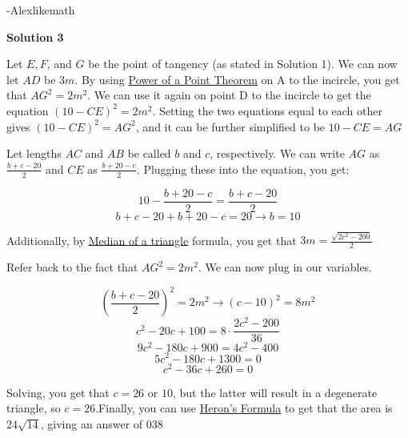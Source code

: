 \begin{enumerate}
 -Alexlikemath

 



\textbf{Solution 3}

Let $E, F$, and $G$ be the point of tangency (as stated in Solution 1). We can now let $AD$ be $3m$. By using \href{https://artofproblemsolving.com/wiki/index.php?title=Power\_of\_a\_Point\_Theorem}{Power of a Point Theorem} on A to the incircle, you get that $AG^2 = 2m^2$. We can use it again on point D to the incircle to get the equation $(10 - CE)^2 = 2m^2$. Setting the two equations equal to each other gives $(10 - CE)^2 = AG^2$, and it can be further simplified to be $10 - CE = AG$

 Let lengths $AC$ and $AB$ be called $b$ and $c$, respectively. We can write $AG$ as $\frac{b + c - 20}{2}$ and $CE$ as $\frac{b + 20 - c}{2}$. Plugging these into the equation, you get:

 
 \[10 - \frac{b + 20 - c}{2} = \frac{b + c - 20}{2}\]
 \[b + c - 20 + b + 20 - c = 20 \rightarrow b = 10\]

 Additionally, by \href{https://artofproblemsolving.com/wiki/index.php?title=Median\_of\_a\_triangle}{Median of a triangle} formula, you get that $3m = \frac{\sqrt{2c^2 - 200}}{2}$

 Refer back to the fact that $AG^2 = 2m^2$. We can now plug in our variables.

 
 \[\left(\frac{b + c - 20}{2}\right)^2 = 2m^2 \rightarrow (c - 10)^2 = 8m^2\]
 \[c^2 - 20c + 100 = 8 \cdot \frac{2c^2 - 200}{36}\]
 \[9c^2 - 180c + 900 = 4c^2 - 400\]
 \[5c^2 - 180c + 1300 = 0\]
 \[c^2 - 36c + 260 = 0\]

 Solving, you get that $c = 26$ or $10$, but the latter will result in a degenerate triangle, so $c = 26$.Finally, you can use \href{https://artofproblemsolving.com/wiki/index.php?title=Heron\%27s\_Formula}{Heron's Formula} to get that the area is $24\sqrt{14}$, giving an answer of $\boxed{038}$



\end{enumerate}